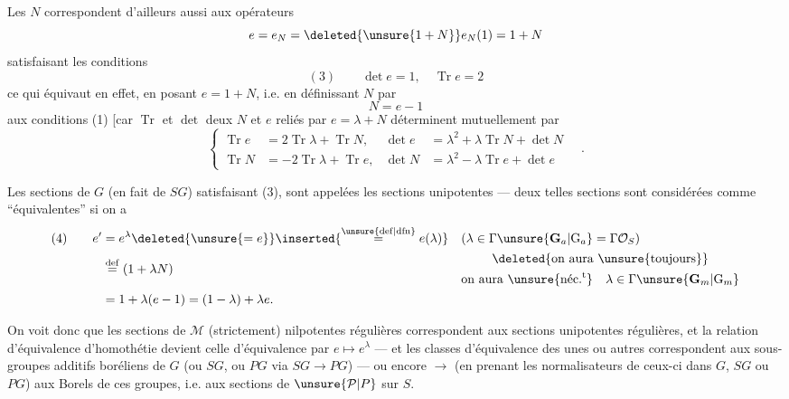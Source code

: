 Les $N$ correspondent d'ailleurs aussi aux opérateurs
\[
e=e_N=\deleted{\unsure{1+N}}e_N(1)=1+N
\]
satisfaisant les conditions
\[
(3)\qquad\det e=1,\quad\operatorname{Tr}e=2
\]
ce qui équivaut en effet, en posant $e=1+N$, i.e. en définissant $N$ par
\[
N=e-1
\]
aux conditions (1) [car $\operatorname{Tr}$ et $\det$  deux  $N$ et $e$ reliés par $e=\lambda+N$  déterminent mutuellement par
\[
\left\{
\begin{aligned}
\operatorname{Tr}e&=2\operatorname{Tr}\lambda+\operatorname{Tr}N,&
\det e&=\lambda^2+\lambda\operatorname{Tr}N+\det N\\
\operatorname{Tr}N&=-2\operatorname{Tr}\lambda+\operatorname{Tr}e,&
\det N&=\lambda^2-\lambda\operatorname{Tr}e+\det e
\end{aligned}
\right.
\quad .
\]



Les  sections de $G$ (en fait de $SG$) satisfaisant (3),  sont appelées les sections  unipotentes  --- deux telles sections  sont considérées comme ``équivalentes'' si on a
\[
\begin{aligned}
(4)\qquad e'&=e^\lambda\deleted{\unsure{=e}}\inserted{\overset{\unsure{\mathrm{def}|\mathrm{dfn}}}{=}e(\lambda)}
&& (\lambda\in\Gamma\unsure{\mathbf G_a|\mathrm G_a}=\Gamma\mathcal O_S)\\
&\overset{\mathrm{def}}{=}(1+\lambda N)
&&\begin{gathered}\deleted{\text{on aura }\unsure{\text{toujours}}}\\\text{on aura }\unsure{\text{néc.}^{\mathrm t}}\quad\lambda\in\Gamma\unsure{\mathbf G_m|\mathrm G_m}\end{gathered}\\
&=1+\lambda(e-1)=(1-\lambda)+\lambda e.
\end{aligned}
\]

On voit donc que les sections de $\mathcal M$ (strictement) nilpotentes régulières correspondent  aux sections unipotentes régulières, et la relation d'équivalence d'homothétie devient celle d'équivalence par $e\longmapsto e^\lambda$ --- et les classes d'équivalence des unes ou autres correspondent aux sous-groupes additifs boréliens de $G$ (ou $SG$, ou $PG$ via $SG\longrightarrow PG$) --- ou encore $\longrightarrow$ (en prenant les normalisateurs de ceux-ci dans $G$, $SG$ ou $PG$) aux Borels de ces groupes, i.e. aux sections de $\unsure{\mathcal P|P}$ sur $S$.

